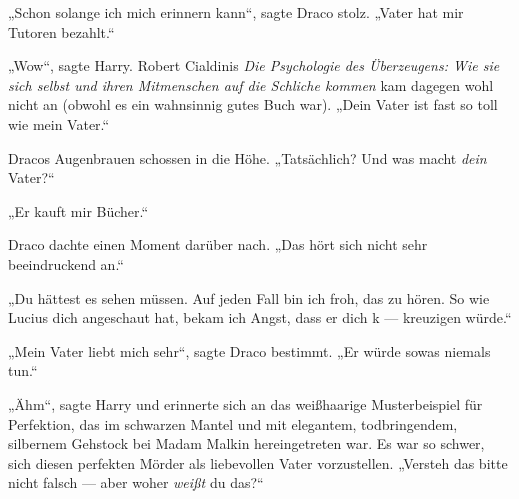 „Schon solange ich mich erinnern kann“, sagte Draco stolz.
„Vater hat mir Tutoren bezahlt.“

„Wow“, sagte Harry. Robert Cialdinis \emph{Die Psychologie des Überzeugens: Wie sie sich selbst und ihren Mitmenschen auf die Schliche kommen} kam dagegen wohl nicht an (obwohl es ein wahnsinnig gutes Buch war).
„Dein Vater ist fast so toll wie mein Vater.“%

Dracos Augenbrauen schossen in die Höhe.
„Tatsächlich? Und was macht \emph{dein} Vater?“

„Er kauft mir Bücher.“

Draco dachte einen Moment darüber nach.
„Das hört sich nicht sehr beeindruckend an.“

„Du hättest es sehen müssen. Auf jeden Fall bin ich froh, das zu hören. So wie Lucius dich angeschaut hat, bekam ich Angst, dass er dich k — kreuzigen würde.“

„Mein Vater liebt mich sehr“, sagte Draco bestimmt.
„Er würde sowas niemals tun.“

„Ähm“, sagte Harry und erinnerte sich an das weißhaarige Musterbeispiel für Perfektion, das im schwarzen Mantel und mit elegantem, todbringendem, silbernem Gehstock bei Madam Malkin hereingetreten war. Es war so schwer, sich diesen perfekten Mörder als liebevollen Vater vorzustellen.
„Versteh das bitte nicht falsch — aber woher \emph{weißt} du das?“

